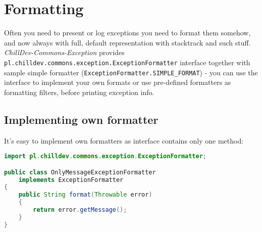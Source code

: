 %

\section{Formatting}

Often you need to present or log exceptions you need to format them somehow, and now always with full, default representation with stacktrack and such stuff. \emph{ChillDev-Commons-Exception} provides \texttt{pl.chilldev.commons.exception.ExceptionFormatter} interface together with sample simple formatter (\texttt{ExceptionFormatter.SIMPLE\_FORMAT}) - you can use the interface to implement your own formats or use pre-defined formatters as formatting filters, before printing exception info.

\subsection{Implementing own formatter}

It's easy to implement own formatters as interface contains only one method:

\begin{lstlisting}[language=Java]
import pl.chilldev.commons.exception.ExceptionFormatter;

public class OnlyMessageExceptionFormatter
    implements ExceptionFormatter
{
    public String format(Throwable error)
    {
        return error.getMessage();
    }
}
\end{lstlisting}
